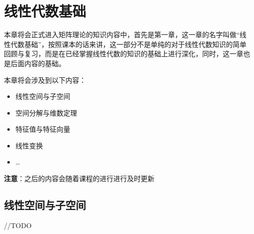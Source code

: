 \documentclass[12pt, a4paper, oneside, UTF8]{ctexbook}
\begin{document}
\else
\fi
\chapter{线性代数基础}
本章将会正式进入矩阵理论的知识内容中，首先是第一章，这一章的名字叫做“线性代数基础”，按照课本的话来讲，这一部分不是单纯的对于线性代数知识的简单回顾与复习，而是在已经掌握线性代数的知识的基础上进行深化，同时，这一章也是后面内容的基础。

本章将会涉及到以下内容：
\begin{itemize}[leftmargin=4em]
    \item 线性空间与子空间
    \item 空间分解与维数定理
    \item 特征值与特征向量
    \item 线性变换
    \item \dots
\end{itemize}
\noindent
\textbf{注意}：之后的内容会随着课程的进行进行及时更新
\newpage
\section{线性空间与子空间}
//TODO
\ifx\allfiles\undefined
\end{document}

